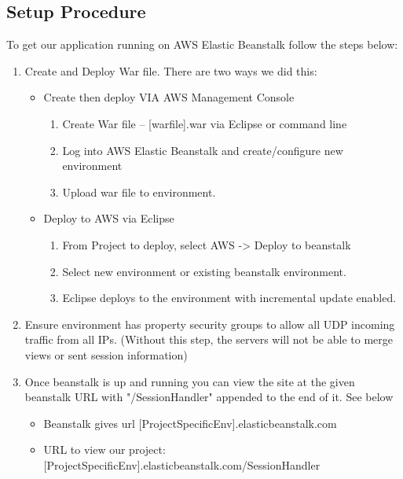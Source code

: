 \documentclass[11pt,letterpaper]{article}
\begin{document}
\subsection{Setup Procedure}
To get our application running on AWS Elastic Beanstalk follow the steps below:
\begin{enumerate}
  \item Create and Deploy War file. There are two ways we did this:
  \begin{itemize}
     \item Create then deploy VIA AWS Management Console
     \begin{enumerate}
     \item Create War file -- [warfile].war via Eclipse or command line
     \item Log into AWS Elastic Beanstalk and create/configure new environment
     \item Upload war file to environment.
     \end{enumerate}
     \item Deploy to AWS via Eclipse
     \begin{enumerate}
     \item From Project to deploy, select AWS -> Deploy to beanstalk
     \item Select new environment or existing beanstalk environment.
     \item Eclipse deploys to the environment with incremental update enabled.
     \end{enumerate}
   \end{itemize}
  \item Ensure environment has property security groups to allow all UDP incoming traffic from all IPs. (Without this step, the servers will not be able to merge views or sent session information)
  \item Once beanstalk is up and running you can view the site at the given beanstalk URL with "/SessionHandler" appended to the end of it. See below
  \begin{itemize}
  \item Beanstalk gives url [ProjectSpecificEnv].elasticbeanstalk.com
  \item URL to view our project: [ProjectSpecificEnv].elasticbeanstalk.com/SessionHandler
  \end{itemize}
\end{enumerate}
\end{document}
